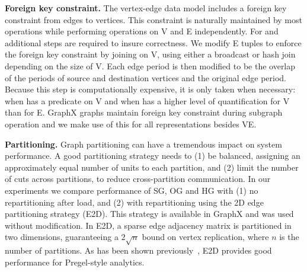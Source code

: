 {\bf Foreign key constraint.}  The vertex-edge data model includes a
foreign key constraint from edges to vertices.  This constraint is
naturally maintained by most operations while performing operations on
V and E independently.  For  and 
additional steps are required to insure correctness.  We modify E
tuples to enforce the foreign key constraint by joining on V, using
either a broadcast or hash join depending on the size of V.  Each edge
period is then modified to be the overlap of the periods of source and
destination vertices and the original edge period.  Because this step
is computationally expensive, it is only taken when necessary: when
 has a predicate on V and when  has a
higher level of quantification for V than for E.  GraphX graphs
maintain foreign key constraint during subgraph operation and we make
use of this for all representations besides VE.

{\bf Partitioning.}  Graph partitioning can have a tremendous impact
on system performance.  A good partitioning strategy needs to (1) be
balanced, assigning an approximately equal number of units to each
partition, and (2) limit the number of cuts across partitions, to
reduce cross-partition communication.  In our experiments we compare
performance of SG, OG and HG with (1) no repartitioning after load,
and (2) with repartitioning using the 2D edge partitioning strategy
(E2D).  This strategy is available in GraphX and was used without
modification.  In E2D, a sparse edge adjacency matrix is partitioned
in two dimensions, guaranteeing a $2 \sqrt{n}$ bound on vertex
replication, where $n$ is the number of partitions. As has been shown
previously~\cite{DBLP:conf/osdi/GonzalezXDCFS14,MoffittTempWeb16}, E2D
provides good performance for Pregel-style analytics.

